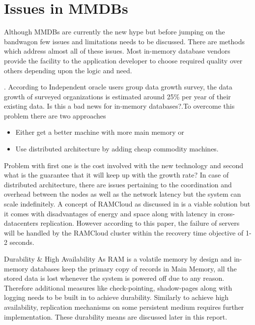 \documentclass[12pt]{article} %
\begin{document}
\section{Issues in MMDBs}
Although MMDBs are currently the new hype but before jumping on the bandwagon few issues and limitations needs to be discussed. There are methods which address almost all of these issues. Most in-memory database vendors provide the facility to the application developer to choose required quality over others depending upon the logic and need. 

\begin{description}
\item[Scalability]. 
According to Independent oracle users group data growth survey\cite{oracleDataGrowth}, the data growth of surveyed organizations is estimated around 25\% per year of their existing data. Is this a bad news for in-memory databases?.To overcome this problem there are two approaches
\begin{itemize}
\item Either get a better machine with more main memory or
\item Use distributed architecture by adding cheap commodity machines. 
\end{itemize}
Problem with first one is the cost involved with the new technology and second what is the guarantee that it will keep up with the growth rate? In case of distributed architecture, there are issues pertaining to the coordination and overhead between the nodes as well as the network latency but the system can scale indefinitely. A concept of RAMCloud as discussed in \cite{ousterhout2010caseRamClouds} is a viable solution but it comes with disadvantages of energy and space along with latency in cross-datacenters replication. However according to this paper, the failure of servers will be handled by the RAMCloud cluster within the recovery time objective of 1-2 seconds. 


\item {Durability \& High Availability}
As RAM is a volatile memory by design and in-memory databases keep the primary copy of records in Main Memory, all the stored data is lost whenever the system is powered off due to any reason. Therefore additional measures like check-pointing, shadow-pages along with logging needs to be built in to achieve durability. Similarly to achieve high availability, replication mechanisms on some persistent medium requires further implementation. These durability means are discussed later in this report. 


\end{description}
\end{document}
